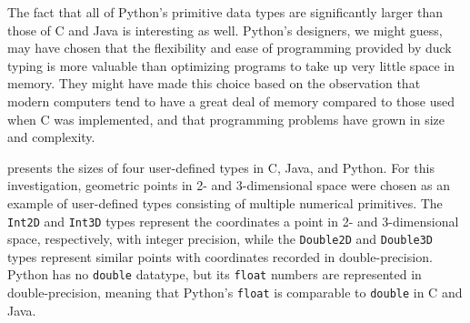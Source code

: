 \documentclass[12pt,letterpaper]{article}
\begin{document}
		The fact that all of Python's primitive data types are significantly larger than those of C and Java is interesting as well. Python's designers, we might guess, may have chosen that the flexibility and ease of programming provided by duck typing is more valuable than optimizing programs to take up very little space in memory. They might have made this choice based on the observation that modern computers tend to have a great deal of memory compared to those used when C was implemented, and that programming problems have grown in size and complexity.

		 presents the sizes of four user-defined types in C, Java, and Python. For this investigation, geometric points in 2- and 3-dimensional space were chosen as an example of user-defined types consisting of multiple numerical primitives. The \texttt{Int2D} and \texttt{Int3D} types represent the coordinates a point in 2- and 3-dimensional space, respectively, with integer precision, while the \texttt{Double2D} and \texttt{Double3D} types represent similar points with coordinates recorded in double-precision. Python has no \texttt{double} datatype, but its \texttt{float} numbers are represented in double-precision, meaning that Python's \texttt{float} is comparable to \texttt{double} in C and Java.
\end{document}
